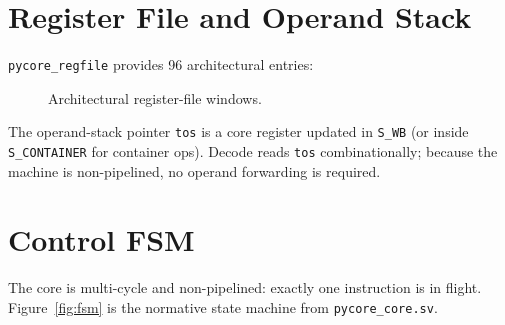 \documentclass[11pt,a4paper]{article}
\newcommand{\modname}[1]{\texttt{#1}}
\begin{document}
\section{Register File and Operand Stack}
\label{sec:regfile}

\modname{pycore\_regfile} provides 96 architectural entries:

\begin{figure}[htbp]
\centering
{}
\caption{Architectural register-file windows.}
\label{fig:rf}
\end{figure}

The operand-stack pointer \texttt{tos} is a core register updated in
\texttt{S\_WB} (or inside \texttt{S\_CONTAINER} for container ops). Decode
reads \texttt{tos} combinationally; because the machine is non-pipelined, no
operand forwarding is required.

\section{Control FSM}
\label{sec:fsm}

The core is multi-cycle and non-pipelined: exactly one instruction is in flight.
Figure~\ref{fig:fsm} is the normative state machine from
\modname{pycore\_core.sv}.
\end{document}
